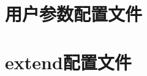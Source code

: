 \documentclass[UTF8,10pt,a4paper]{ctexart}
\begin{document}
\newpage                                                                                                                                                                          
\begin{appendices}
\renewcommand\appendixpagename{附录}
\renewcommand\appendixtocname{附录}
\appendixpage
\renewcommand\thesection{\Roman{section}}
\renewcommand{\appendixname}{Appendix}

\section{用户参数配置文件}
 \label{B}
 {\color{cyan} }


\newpage
\section{extend配置文件}
  \label{C}
  {\color{cyan} }
  

\end{appendices}
\end{document}
